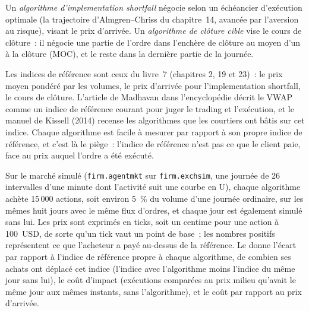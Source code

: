 \begin{definition}\label{def:mx:benchmark-algorithms:is}
Un \emph{algorithme d'implementation shortfall} négocie selon un échéancier d'exécution optimale (la trajectoire d'Almgren--Chriss
du chapitre~14, avancée par l'aversion au risque), visant le prix d'arrivée. Un
\emph{algorithme de clôture cible} vise le cours de clôture~: il négocie une partie de l'ordre dans l'enchère de clôture au moyen d'un  à la clôture (MOC), et le reste dans la dernière
partie de la journée.
\end{definition}

Les indices de référence sont ceux du livre~7 (chapitres 2, 19 et 23)~: le prix moyen pondéré par les volumes, le prix d'arrivée pour
l'implementation shortfall, le cours de clôture. L'article de Madhavan dans l'encyclopédie décrit le VWAP comme un indice de référence courant pour juger le trading et l'exécution, et le manuel de Kissell
(2014) recense les algorithmes que les courtiers ont bâtis sur cet indice. Chaque algorithme est facile à mesurer par rapport à son propre indice de référence, et c'est là le piège~:
l'indice de référence n'est pas ce que le client paie, face au prix auquel l'ordre a été exécuté.

Sur le marché simulé (\texttt{firm.agentmkt} sur \texttt{firm.exchsim}, une journée de 26 intervalles d'une minute dont l'activité suit une courbe en U), chaque
algorithme achète 15\,000 actions, soit environ 5~\% du volume d'une journée ordinaire, sur les mêmes huit jours avec le même flux d'ordres, et chaque jour est également
simulé sans lui. Les prix sont exprimés en ticks, soit un centime pour une action à 100~USD, de sorte qu'un tick vaut un point de base~; les nombres positifs représentent ce que l'acheteur a payé au-dessus de la
référence. Le  donne l'écart par rapport à l'indice de référence propre à chaque algorithme, de combien ses achats ont déplacé cet indice
(l'indice avec l'algorithme moins l'indice du même jour sans lui), le coût d'impact (exécutions comparées au prix milieu qu'avait le même jour aux mêmes instants,
sans l'algorithme), et le coût par rapport au prix d'arrivée.

